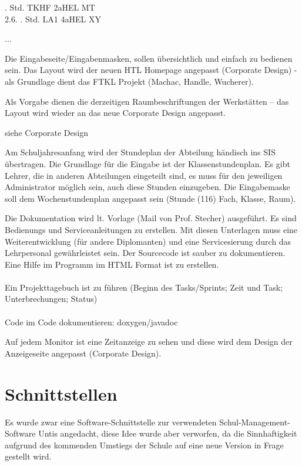 \begin{description}[style=nextline]
\begin{tabbing}
 . Std. \> TKHF \> 2aHEL \> MT\\
2.6. . Std. \> LA1 \> 4aHEL \> XY
\end{tabbing}
		...
	\item[Layout]
		Die Eingabeseite/Eingabenmasken, sollen übersichtlich und einfach zu bedienen sein. Das Layout wird der neuen HTL Homepage angepasst (Corporate Design) - als Grundlage dient das FTKL Projekt (Machac, Handle, Wucherer).\\
		\begin{description}[style=nextline]
			\item[Stundenplandesign]
				Als Vorgabe dienen die derzeitigen Raumbeschriftungen der Werkstätten – das Layout wird wieder an das neue Corporate Design angepasst.
			\item[App­Design]
				siehe Corporate Design
			\item[Stundenplaneingabe]
				Am Schuljahresanfang wird der Stundeplan der Abteilung händisch ins SIS übertragen. Die Grundlage für die Eingabe ist der Klassenstundenplan. Es gibt Lehrer, die in anderen Abteilungen eingeteilt sind, es muss für den jeweiligen Administrator möglich sein, auch diese Stunden einzugeben. Die Eingabemaske soll dem Wochenstundenplan angepasst sein (Stunde (1­16) Fach, Klasse, Raum).
			\item[Dokumentation]
				Die Dokumentation wird lt. Vorlage (Mail von Prof. Stecher) ausgeführt. Es sind Bedienungs­ und Serviceanleitungen zu erstellen. Mit diesen Unterlagen muss eine Weiterentwicklung (für andere Diplomanten) und eine Servicesierung durch das Lehrpersonal gewährleistet sein. Der Sourcecode ist sauber zu dokumentieren. Eine Hilfe im Programm im HTML Format ist zu erstellen.\\
				\\
				Ein Projekttagebuch ist zu führen (Beginn des Tasks/Sprints; Zeit und Task; Unterbrechungen; Status)\\
				\\
				Code im Code dokumentieren: doxygen/javadoc
		\end{description}
	\item[Uhranzeige]
		Auf jedem Monitor ist eine Zeitanzeige zu sehen und diese wird dem Design der Anzeigeseite angepasst (Corporate Design).
\end{description}

\section{Schnittstellen}
Es wurde zwar eine Software-Schnittstelle zur verwendeten Schul-Management-Software Untis angedacht, diese Idee wurde aber verworfen, da die Sinnhaftigkeit aufgrund des kommenden Umstiegs der Schule auf eine neue Version in Frage gestellt wird.

